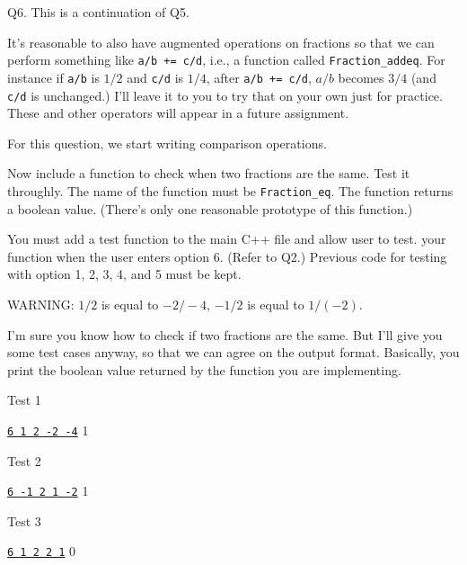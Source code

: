 Q6.
This is a continuation of Q5.

It's reasonable to also have augmented operations on fractions so that
we can perform something like \verb!a/b += c/d!, i.e., a function
called \verb!Fraction_addeq!.
For instance if \verb!a/b! is $1/2$ and \verb!c/d! is $1/4$,
after \verb!a/b += c/d!, $a/b$ becomes $3/4$ (and \verb!c/d! is unchanged.)
I'll leave it to you to try that on your own just for practice.
These and other operators will appear in a future assignment.

For this question, we start writing comparison operations.

Now include a function to check when two fractions are the same.
Test it throughly.
The name of the function must be \verb!Fraction_eq!.
The function returns a boolean value.
(There's only one reasonable prototype of this function.)

You must add a test function to the main C++ file and allow user to test.
your function when the user enters option 6. (Refer to Q2.)
Previous code for testing with option 1, 2, 3, 4, and 5 must be kept.


WARNING: $1/2$ is equal to $-2/-4$, $-1/2$ is equal to $1/(-2)$.

I'm sure you know how to check if two fractions are the same.
But I'll give you some test cases anyway, so that we can agree on the
output format. Basically, you print the boolean value returned by the
function you are implementing.

Test 1
\begin{console}[commandchars=\\\{\}]
\underline{\texttt{6 1 2 -2 -4}}
1
\end{console}

Test 2
\begin{console}[commandchars=\\\{\}]
\underline{\texttt{6 -1 2 1 -2}}
1
\end{console}

Test 3
\begin{console}[commandchars=\\\{\}]
\underline{\texttt{6 1 2 2 1}}
0
\end{console}



